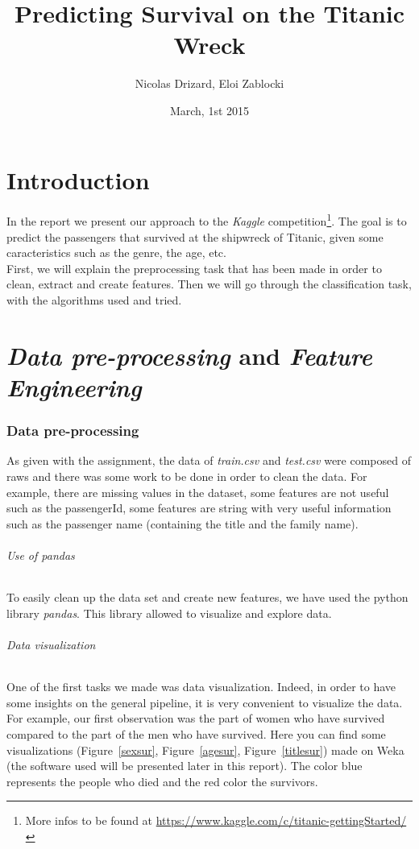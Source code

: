 \documentclass[11pt,a4paper,portrait]{article}
\author{Nicolas Drizard, Eloi Zablocki}
\date{March, 1st 2015}
\title{Predicting Survival on the Titanic Wreck}
\begin{document}
\maketitle


\newpage
\part*{Introduction}
In the report we present our approach to the \textit{Kaggle} competition\footnote{More infos to be found at \url{https://www.kaggle.com/c/titanic-gettingStarted/}}. The goal is to predict the passengers that survived at the shipwreck of Titanic, given some caracteristics such as the genre, the age, etc.\\
First, we will explain the preprocessing task that has been made in order to clean, extract and create features. Then we will go through the classification task, with the algorithms used and tried.

\part{\textit{Data pre-processing} and \textit{Feature Engineering}}
\setcounter{section}{0}


\section{Data pre-processing}
As given with the assignment, the data of \textit{train.csv} and \textit{test.csv} were composed of raws and there was some work to be done in order to clean the data. For example, there are missing values in the dataset, some features are not useful such as the passengerId, some features are string with very useful information such as the passenger name (containing the title and the family name).

\paragraph{Use of pandas}
To easily clean up the data set and create new features, we have used the python library \textit{pandas}. This library allowed to visualize and explore data.

\paragraph{Data visualization}
One of the first tasks we made was data visualization. Indeed, in order to have some insights on the general pipeline, it is very convenient to visualize the data. For example, our first observation was the part of women who have survived compared to the part of the men who have survived. Here you can find some visualizations (Figure~\ref{sexsur}, Figure~\ref{agesur}, Figure~\ref{titlesur}) made on Weka (the software used will be presented later in this report). The color blue represents the people who died and the red color the survivors.
\end{document}
